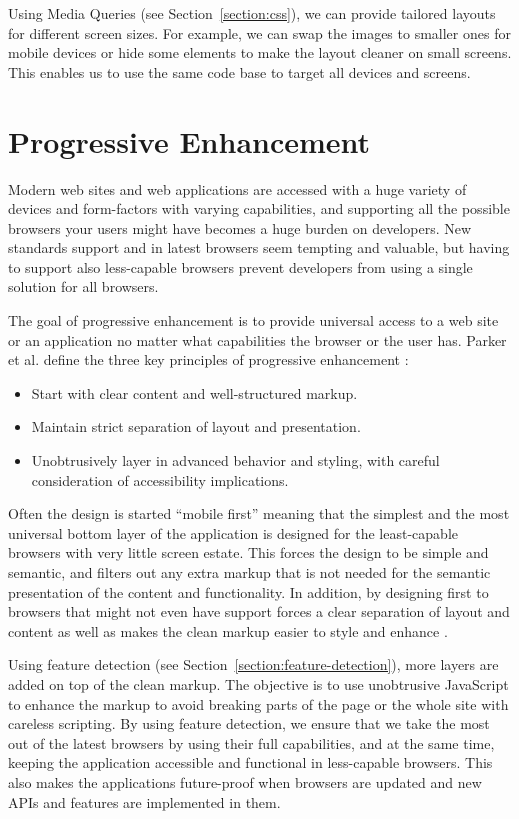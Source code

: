 Using Media Queries (see Section~\ref{section:css}), we can provide
tailored layouts for different screen sizes. For example, we can swap
the images to smaller ones for mobile devices or hide some elements to
make the layout cleaner on small screens. This enables us to use the
same code base to target all devices and screens.

\section{Progressive Enhancement}
\label{subsection:progressive-enhancement}

Modern web sites and web applications are accessed with a huge variety
of devices and form-factors with varying capabilities, and supporting
all the possible browsers your users might have becomes a huge burden
on developers. New standards support and  in latest
browsers seem tempting and valuable, but having to support also
less-capable browsers prevent developers from using a single solution
for all browsers.

The goal of progressive enhancement is to provide universal access to
a web site or an application no matter what capabilities the browser
or the user has. Parker et al. define the three key principles of
progressive enhancement \cite{parker2010designing}:

\begin{itemize}
\item Start with clear content and well-structured markup.
\item Maintain strict separation of layout and presentation.
\item Unobtrusively layer in advanced behavior and styling, with
  careful consideration of accessibility implications.
\end{itemize}

Often the design is started ``mobile first'' meaning that the simplest
and the most universal bottom layer of the application is designed for
the least-capable browsers with very little screen estate. This forces
the design to be simple and semantic, and filters out any extra markup
that is not needed for the semantic presentation of the content and
functionality. In addition, by designing first to browsers that might
not even have  support forces a clear separation of layout
and content as well as makes the clean markup easier to style and
enhance \cite{parker2010designing}.

Using feature detection (see Section~\ref{section:feature-detection}),
more layers are added on top of the clean markup. The objective is to
use unobtrusive JavaScript to enhance the markup to avoid breaking
parts of the page or the whole site with careless scripting. By using
feature detection, we ensure that we take the most out of the latest
browsers by using their full capabilities, and at the same time,
keeping the application accessible and functional in less-capable
browsers. This also makes the applications future-proof when browsers
are updated and new APIs and features are implemented in
them. \cite{parker2010designing}

